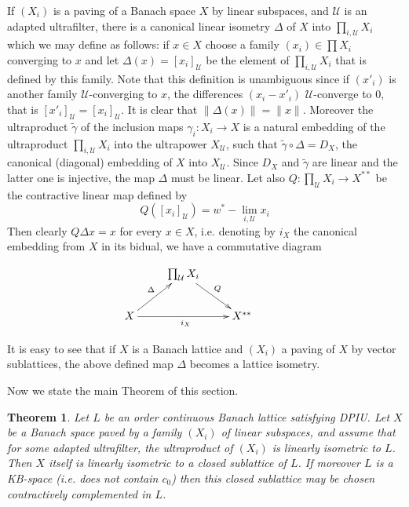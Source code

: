 \documentclass[11pt]{amsart}
\theoremstyle{plain}
\newtheorem{theorem}{Theorem}[section]
\theoremstyle{remark}
\newcommand{\U}{\mathcal U}
\begin{document}
If $(X_i)$ is a paving of a Banach space $X$ by linear subspaces, and $\U$ is an adapted ultrafilter, there is a canonical  linear isometry $\Delta$ of $X$ into $\prod_{i,\U} X_i$ which we may define as follows:
if $x\in X$ choose a family $(x_i)\in \prod X_i$ converging to $x$ and let $\Delta(x)=[x_i]_\U$ be the element of $\prod_{i,\U} X_i$ that is defined by this family. Note that this definition is unambiguous since if $(x'_i)$ is another family $\U$-converging to $x$, the differences $(x_i-x'_i)$ $\U$-converge to 0, that is $[x'_i]_\U=[x_i]_\U$. It is clear that $\|\Delta(x)\|=\|x\|$. Moreover the ultraproduct $\tilde\gamma$ of the inclusion maps $\gamma_i: X_i\to X$ is a natural embedding   of the ultraproduct $\prod_{i,\U} X_i$ into the ultrapower $X_\U$, such that $\tilde\gamma\circ \Delta=D_X$, the canonical (diagonal) embedding of $X$ into $X_\U$. Since $D_X$ and $\tilde\gamma$ are linear and the latter one is injective, the map $\Delta$ must be linear.  Let also $Q:\prod_\U X_i\to X^{**}$ be the contractive linear map defined by 
\begin{equation}\label{eq:Q}
Q([x_i]_\U)= w^*-\lim\limits_{i,\U} x_i
\end{equation}
Then clearly $Q\Delta x=x$ for every $x\in X$, i.e. denoting by $i_X$ the canonical embedding from $X$ in its bidual, we have a commutative diagram
 
\[\xymatrix{&\prod_\U X_i\ar^Q[dr]&\\X\ar^{\Delta}[ur]\ar_{i_X}[rr]
&&X^{**}&}\]

It is easy to see that if $X$ is a Banach lattice and $(X_i)$ a paving of $X$ by vector sublattices, the above defined map $\Delta$ becomes a lattice isometry.

Now we state the main Theorem of this section.

\begin{theorem}\label{L-inverse ultraprod} Let $L$ be an order continuous Banach lattice 
satisfying DPIU. Let $X$ be a Banach space paved by a family $(X_i)$ of linear subspaces, and assume that for some adapted ultrafilter, the ultraproduct of $(X_i)$ is linearly isometric to $L$. Then $X$ itself is linearly isometric to a  closed sublattice of $L$. If moreover $L$ is a KB-space (i.e. does not contain $c_0$) then  this  closed sublattice may be chosen contractively complemented in $L$.
\end{theorem}
\end{document}
